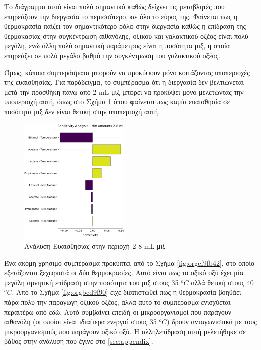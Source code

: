 \documentclass[11pt]{report}
\begin{document}
Το διάγραμμα αυτό είναι πολύ σημαντικό καθώς δείχνει τις μεταβλητές που επηρεάζουν την διεργασία το περισσότερο, σε όλο το εύρος της. Φαίνεται πως η θερμοκρασία παίζει τον σημαντικότερο ρόλο στην διεργασία καθώς η επίδραση της θερμοκασίας στην συγκέντρωση αιθανόλης, οξικού και γαλακτικού οξέος είναι πολύ μεγάλη, ενώ άλλη πολύ σημαντική παράμετρος είναι η ποσότητα μιξ, η οποία επηρεάζει σε πολύ μεγάλο βαθμό την συγκέντρωση του γαλακτικού οξέος.

Όμως, κάποια συμπεράσματα μπορούν να προκύψουν μόνο κοιτάζοντας υποπεριοχές της ευαισθησίας. Για παράδειγμα, το συμπέρασμα ότι η διεργασία δεν βελτιώνεται μετά την προσθήκη πάνω από 2 mL μιξ μπορεί να προκύψει μόνο μελετώντας την υποπεριοχή αυτή, όπως στο Σχήμα \ref{fig:org023e1d2} όπου φαίνεται πως καμία ευαισθησία σε ποσότητα μιξ δεν είναι θετική στην υποπεριοχή αυτή.

\pagebreak

\begin{figure}[htbp]
\centering
\includegraphics[width=200px]{../plots/sensitivity/tornado_high.png}
\caption{\label{fig:org023e1d2}Ανάλυση Ευαισθησίας στην περιοχή 2-8 mL μιξ}
\end{figure}

Ένα ακόμη χρήσιμο συμπέρασμα προκύπτει από το Σχήμα \ref{fig:orgef9fb42}, στο οποίο εξετάζονται ξεχωριστά οι δύο θερμοκρασίες. Αυτό είναι πως το οξικό οξύ έχει μία μεγάλη αρνητική επίδραση στην ποσότητα του μιξ στους 35 \(^oC\) αλλά θετική στους 40 \(^oC\). Από το Σχήμα \ref{fig:orgbcd9f90} είχε διαπιστωθεί πως η θερμοκρασία βοηθάει πάρα πολύ την παραγωγή οξικού οξέος, αλλά αυτό το συμπέρασμα ενισχύεται περαιτέρω από εδώ. Αυτό συμβαίνει επειδή οι μικροοργανισμοί που παράγουν αιθανόλη (οι οποίοι είναι ιδιαίτερα ενεργοί στους 35 \(^oC\)) δρουν ανταγωνιστικά με τους μικροοργανισμούς που παράγουν οξικό οξύ. Η αλληλεπίδραση αυτή μελετήθηκε σε βάθος στην ανάλυση που έγινε στο \autoref{sec:appendix}. 
\end{document}
